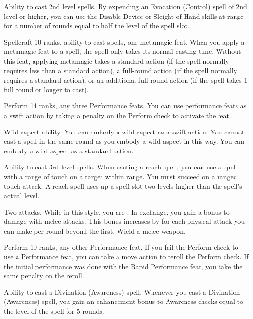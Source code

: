 \featpre Ability to cast 2nd level spells.
\featben By expending an Evocation (Control) spell of 2nd level or higher, you can use the Disable Device or Sleight of Hand skills at \rngclose range for a number of rounds equal to half the level of the spell slot.

\featpres
Spellcraft 10 ranks, ability to cast spells, one metamagic feat.
\featben When you apply a metamagic feat to a spell, the spell only takes its normal casting time.
Without this feat, applying metamagic takes a standard action (if the spell normally requires less than a standard action), a full-round action (if the spell normally requires a standard action), or an additional full-round action (if the spell takes 1 full round or longer to cast).

\featpres Perform 14 ranks, any three Performance feats.
\featben You can use performance feats as a swift action by taking a  penalty on the Perform check to activate the feat.

\featpre Wild aspect ability.
\featben You can embody a wild aspect as a swift action.
You cannot cast a spell in the same round as you embody a wild aspect in this way.
You can embody a wild aspect as a standard action.

\featpre Ability to cast 3rd level spells.
\featben When casting a reach spell, you can use a spell with a range of touch on a target within \rngclose range.
You must succeed on a ranged touch attack.
A reach spell uses up a spell slot two levels higher than the spell's actual level.

\featpre Two attacks.
\featben While in this style, you are .
In exchange, you gain a  bonus to damage with melee attacks.
This bonus increases by  for each physical attack you can make per round beyond the first.
\stylereq Wield a melee weapon.

\featpres Perform 10 ranks, any other Performance feat.
\featben If you fail the Perform check to use a Performance feat, you can take a move action to reroll the Perform check.
If the initial performance was done with the Rapid Performance feat, you take the same  penalty on the reroll.

\featpre Ability to cast a Divination (Awareness) spell.
\featben Whenever you cast a Divination (Awareness) spell, you gain an enhancement bonus to Awareness checks equal to the level of the spell for 5 rounds.

